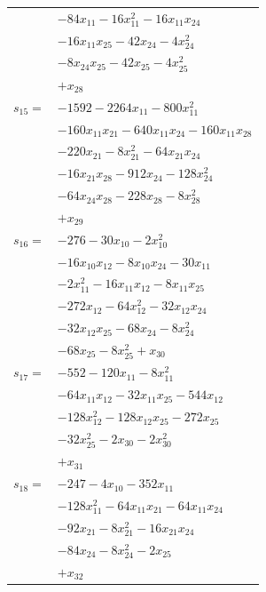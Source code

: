 \begin{longtable}{@{}r@{\;}l@{}}
 & \(\displaystyle -84x_{11} -16x_{11}^{2} -16x_{11}x_{24}\) \\
 & \(\displaystyle -16x_{11}x_{25} -42x_{24} -4x_{24}^{2}\) \\
 & \(\displaystyle -8x_{24}x_{25} -42x_{25} -4x_{25}^{2}\) \\
 & \(\displaystyle +x_{28}\) \\[3pt]
\(s_{15}=\) & \(\displaystyle -1592 -2264x_{11} -800x_{11}^{2}\) \\
 & \(\displaystyle -160x_{11}x_{21} -640x_{11}x_{24} -160x_{11}x_{28}\) \\
 & \(\displaystyle -220x_{21} -8x_{21}^{2} -64x_{21}x_{24}\) \\
 & \(\displaystyle -16x_{21}x_{28} -912x_{24} -128x_{24}^{2}\) \\
 & \(\displaystyle -64x_{24}x_{28} -228x_{28} -8x_{28}^{2}\) \\
 & \(\displaystyle +x_{29}\) \\[3pt]
\(s_{16}=\) & \(\displaystyle -276 -30x_{10} -2x_{10}^{2}\) \\
 & \(\displaystyle -16x_{10}x_{12} -8x_{10}x_{24} -30x_{11}\) \\
 & \(\displaystyle -2x_{11}^{2} -16x_{11}x_{12} -8x_{11}x_{25}\) \\
 & \(\displaystyle -272x_{12} -64x_{12}^{2} -32x_{12}x_{24}\) \\
 & \(\displaystyle -32x_{12}x_{25} -68x_{24} -8x_{24}^{2}\) \\
 & \(\displaystyle -68x_{25} -8x_{25}^{2} +x_{30}\) \\[3pt]
\(s_{17}=\) & \(\displaystyle -552 -120x_{11} -8x_{11}^{2}\) \\
 & \(\displaystyle -64x_{11}x_{12} -32x_{11}x_{25} -544x_{12}\) \\
 & \(\displaystyle -128x_{12}^{2} -128x_{12}x_{25} -272x_{25}\) \\
 & \(\displaystyle -32x_{25}^{2} -2x_{30} -2x_{30}^{2}\) \\
 & \(\displaystyle +x_{31}\) \\[3pt]
\(s_{18}=\) & \(\displaystyle -247 -4x_{10} -352x_{11}\) \\
 & \(\displaystyle -128x_{11}^{2} -64x_{11}x_{21} -64x_{11}x_{24}\) \\
 & \(\displaystyle -92x_{21} -8x_{21}^{2} -16x_{21}x_{24}\) \\
 & \(\displaystyle -84x_{24} -8x_{24}^{2} -2x_{25}\) \\
 & \(\displaystyle +x_{32}\) \\[3pt]

\end{longtable}
